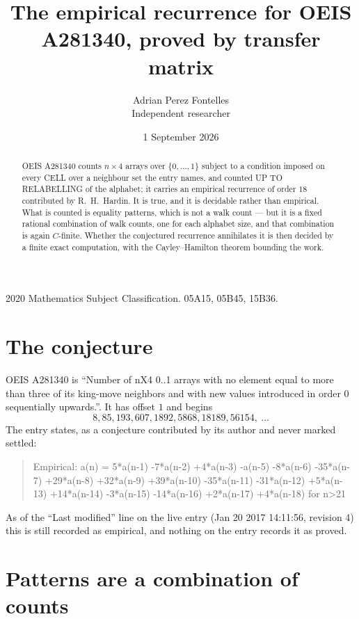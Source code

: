 \documentclass[11pt,a4paper]{article}
\title{The empirical recurrence for OEIS A281340, proved by transfer matrix}
\author{Adrian Perez Fontelles\\ \small Independent researcher}
\date{1 September 2026}
\theoremstyle{plain}
\theoremstyle{definition}
\begin{document}
\maketitle

\begin{abstract}
OEIS A281340 counts $n\times4$ arrays over $\{0,\dots,1\}$ subject to a condition imposed on
every CELL over a neighbour set the entry names, and counted UP TO RELABELLING of the
alphabet; it carries an empirical recurrence of order $18$ contributed by
R.~H.~Hardin. It is true, and it is decidable rather than empirical. What is counted is
equality patterns, which is not a walk count --- but it is a fixed rational combination of
walk counts, one for each alphabet size, and that combination is again $C$-finite. Whether the
conjectured recurrence annihilates it is then decided by a finite exact computation, with the
Cayley--Hamilton theorem bounding the work.
\end{abstract}

\noindent\small 2020 Mathematics Subject Classification. 05A15, 05B45, 15B36.\normalsize

\section{The conjecture}

OEIS A281340 is ``Number of nX4 0..1 arrays with no element equal to more than three of its king-move neighbors and with new values introduced in order 0 sequentially upwards.''. It has offset $1$ and begins
\[
8, 85, 193, 607, 1892, 5868, 18189, 56154,\ \dots
\]
The entry states, as a conjecture contributed by its author and never marked settled:
\begin{quote}
Empirical: a(n) = 5*a(n-1) -7*a(n-2) +4*a(n-3) -a(n-5) -8*a(n-6) -35*a(n-7) +29*a(n-8) +32*a(n-9) +39*a(n-10) -35*a(n-11) -31*a(n-12) +5*a(n-13) +14*a(n-14) -3*a(n-15) -14*a(n-16) +2*a(n-17) +4*a(n-18) for n>21
\end{quote}
As of the ``Last modified'' line on the live entry (Jan 20 2017 14:11:56, revision 4) this is still
recorded as empirical, and nothing on the entry records it as proved.

\section{Patterns are a combination of counts}
\end{document}
